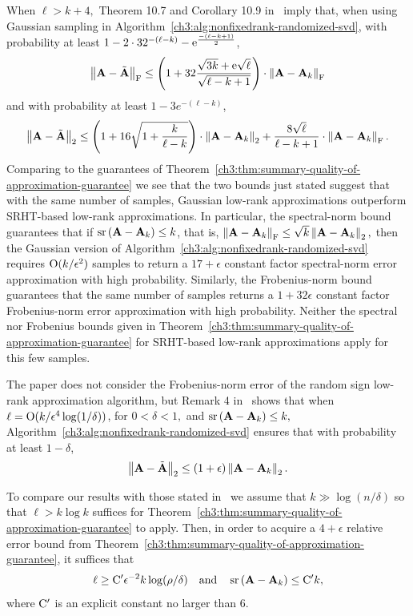 When $\ell > k+4,$ Theorem 10.7 and Corollary 10.9 in~\cite{HMT11} imply that, 
when using Gaussian sampling in Algorithm~\ref{ch3:alg:nonfixedrank-randomized-svd},
with probability at least 
$1 - 2 \cdot 32^{-(\ell-k)} - \mathrm{e}^{\frac{-(\ell-k+1)}{2}}$,
\[
 \left\|\mathbf{A} - \tilde{\mathbf{A}}\right\|_\mathrm{F} \leq 
  \left( 1 + 32 \frac{ \sqrt{3 k} + \mathrm{e} \sqrt{\ell} }{\sqrt{\ell -k+1}}  \right) 
  \cdot \left\|\mathbf{A} - \mathbf{A}_k\right\|_\mathrm{F}
\]
and with probability at least $1 - 3e^{-(\ell-k)}$,
\[
 \left\|\mathbf{A} - \tilde{\mathbf{A}}\right\|_2 \leq 
 \left(1 + 16\sqrt{1 + \frac{k}{\ell-k}} \right) \cdot 
 \left\|\mathbf{A} - \mathbf{A}_k\right\|_2 + \frac{8\sqrt{\ell}}{\ell-k+1} \cdot \left\|\mathbf{A} - \mathbf{A}_k\right\|_\mathrm{F}.
\]
Comparing to the guarantees of Theorem~\ref{ch3:thm:summary-quality-of-approximation-guarantee} 
we see that the two bounds just stated suggest that with the same number of samples, 
Gaussian low-rank approximations outperform SRHT-based low-rank approximations. 
In particular, the spectral-norm bound guarantees that if $\operatorname{sr}\left(\mathbf{A} - \mathbf{A}_k\right) \leq k$, that is,
$ \left\|\mathbf{A} - \mathbf{A}_k\right\|_\mathrm{F} \le \sqrt{k} \left\|\mathbf{A} - \mathbf{A}_k\right\|_2,$
then the Gaussian version of Algorithm~\ref{ch3:alg:nonfixedrank-randomized-svd}
requires $\mathrm{O}(k/\epsilon^2)$ samples to return a
$17+\epsilon$ constant factor spectral-norm error approximation with high 
probability. Similarly, the Frobenius-norm bound guarantees that the same 
number of samples returns a $1 + 32 \epsilon$ constant factor Frobenius-norm
error approximation with high probability. Neither the spectral nor Frobenius 
bounds given in Theorem~\ref{ch3:thm:summary-quality-of-approximation-guarantee} 
for SRHT-based low-rank approximations apply for this few samples.

The paper \cite{Zou10} does not consider the Frobenius-norm error of the 
random sign low-rank approximation algorithm, but Remark 4 in~\cite{Zou10} 
shows that when $\ell = \mathrm{O}(k/\epsilon^4 \log(1/\delta) )$, 
for $0 < \delta < 1,$ and $\operatorname{sr}\left(\mathbf{A} - \mathbf{A}_k\right) \leq k,$ 
Algorithm~\ref{ch3:alg:nonfixedrank-randomized-svd} ensures that with probability 
at least $1-\delta$,
\[
 \left\|\mathbf{A} - \tilde{\mathbf{A}}\right\|_2 \leq (1 + \epsilon) \left\|\mathbf{A} - \mathbf{A}_k\right\|_2.
\]

To compare our results with those stated in~\cite{HMT11,Zou10} we assume that 
$k \gg \log(n/\delta)$ so that $\ell > k\log k$ suffices for 
Theorem~\ref{ch3:thm:summary-quality-of-approximation-guarantee} to apply. 
Then, in order to acquire a $4 + \epsilon$ relative error bound from 
Theorem~\ref{ch3:thm:summary-quality-of-approximation-guarantee}, it suffices that
\[
 \ell \geq \mathrm{C}^\prime \epsilon^{-2} k \log(\rho/\delta) \quad \text{and}
 \quad \operatorname{sr}\left(\mathbf{A} - \mathbf{A}_k\right) \leq \mathrm{C}^\prime k,
\]
where $\mathrm{C}^\prime$ is an explicit constant no larger than 6.

